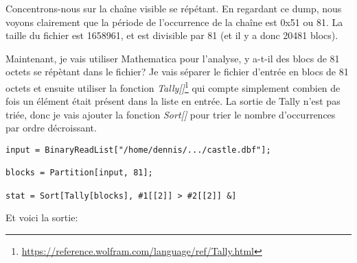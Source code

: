 

Concentrons-nous sur la chaîne visible  se répétant.
En regardant ce dump, nous voyons clairement que la période de l'occurrence de la chaîne
est 0x51 ou 81.
La taille du fichier est 1658961, et est divisible par 81 (et il y a donc 20481 blocs).

Maintenant, je vais utiliser Mathematica pour l'analyse, y a-t-il des blocs de 81
octets se répètant dans le fichier?
Je vais séparer le fichier d'entrée en blocs de 81 octets et ensuite utiliser la fonction
\emph{Tally[]}\footnote{\url{https://reference.wolfram.com/language/ref/Tally.html}}
qui compte simplement combien de fois un élément était présent dans la liste en entrée.
La sortie de Tally n'est pas triée, donc je vais ajouter la fonction \emph{Sort[]}
pour trier le nombre d'occurrences par ordre décroissant.

\begin{lstlisting}[style=custommath]
input = BinaryReadList["/home/dennis/.../castle.dbf"];

blocks = Partition[input, 81];

stat = Sort[Tally[blocks], #1[[2]] > #2[[2]] &]
\end{lstlisting}

Et voici la sortie:

